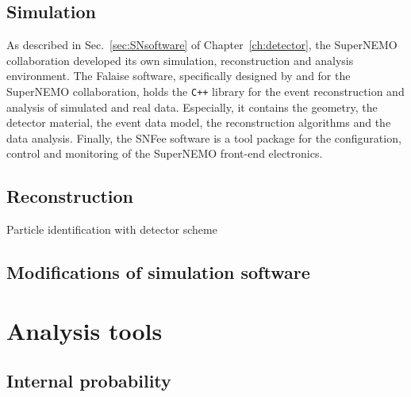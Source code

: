 \subsection{Simulation}

As described in Sec.~\ref{sec:SNsoftware} of Chapter~\ref{ch:detector}, the SuperNEMO collaboration developed its own simulation, reconstruction and analysis environment.
The Falaise software, specifically designed by and for the SuperNEMO collaboration, holds the \verb!C++! library for the event reconstruction and analysis of simulated and real data.
Especially, it contains the geometry, the detector material, the event data model, the reconstruction algorithms and the data analysis.
Finally, the SNFee software is a tool package for the configuration, control and monitoring of the SuperNEMO front-end electronics.

\subsection{Reconstruction}

Particle identification with detector scheme

\subsection{Modifications of simulation software}

\section{Analysis tools}

\subsection{Internal probability}
\label{subsec:internal_prob}

